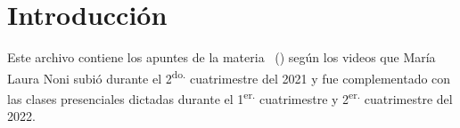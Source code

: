 \chapter{Introducción}

Este archivo contiene los apuntes de la materia \materia \, (\codigomateria)
según los videos que María Laura Noni subió durante el 2\textsuperscript{do.}
cuatrimestre del 2021 y fue complementado con las clases presenciales 
dictadas durante el 1\textsuperscript{er.} cuatrimestre 
y 2\textsuperscript{er.} cuatrimestre del 2022.
